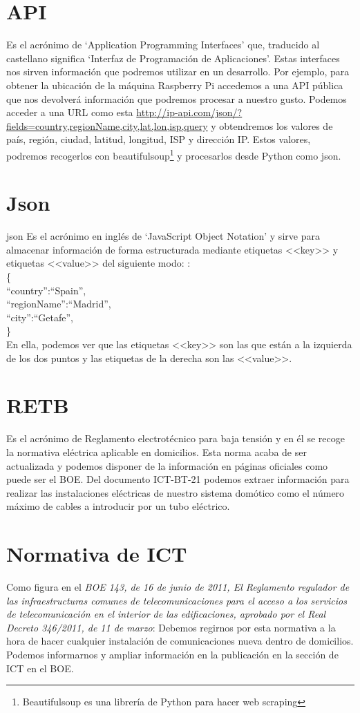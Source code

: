 \section{API}
Es el acrónimo de ‘Application Programming Interfaces’ que, traducido al castellano significa ‘Interfaz de Programación de Aplicaciones’. Estas interfaces nos sirven información que podremos utilizar en un desarrollo.
Por ejemplo, para obtener la ubicación de la máquina Raspberry Pi accedemos a una API pública que nos devolverá información que podremos procesar a nuestro gusto.
Podemos acceder a una URL como esta  \url{http://ip-api.com/json/?fields=country,regionName,city,lat,lon,isp,query} y obtendremos los valores de país, región, ciudad, latitud, longitud, ISP y dirección IP.
Estos valores, podremos recogerlos con beautifulsoup\footnote{Beautifulsoup es una librería de Python para hacer web scraping} y procesarlos desde Python como json.

\section{Json}{json\cite{misc:Json}}
Es el acrónimo en inglés de ‘JavaScript Object Notation’ y sirve para almacenar información de forma estructurada mediante etiquetas <<key>> y etiquetas <<value>> del siguiente modo: : \\
\{\\``country'':``Spain'',\\ ``regionName'':``Madrid'',\\ ``city'':``Getafe'',\\\}\\

En ella, podemos ver que las etiquetas <<key>> son las que están a la izquierda de los dos puntos y las etiquetas de la derecha son las <<value>>.

\section{RETB}
Es el acrónimo de Reglamento electrotécnico para baja tensión y en él se recoge la normativa eléctrica aplicable en domicilios.
Esta norma acaba de ser actualizada y podemos disponer de la información en páginas oficiales como puede ser el BOE\cite{manual:REBT}.
Del documento ICT-BT-21\cite{manual:ICT-BT-21} podemos extraer información para realizar las instalaciones eléctricas de nuestro sistema domótico como el número máximo de cables a introducir por un tubo eléctrico.

\section{Normativa de ICT}
Como figura en el \textit{BOE 143, de 16 de junio de 2011, El Reglamento regulador de las infraestructuras comunes de telecomunicaciones para el acceso a los servicios de telecomunicación en el interior de las edificaciones, aprobado por el Real Decreto 346/2011, de 11 de marzo}:
Debemos regirnos por esta normativa a la hora de hacer cualquier instalación de comunicaciones nueva dentro de domicilios.
Podemos informarnos y ampliar información en la publicación en la sección de ICT en el BOE\cite{manual:ICT}.

